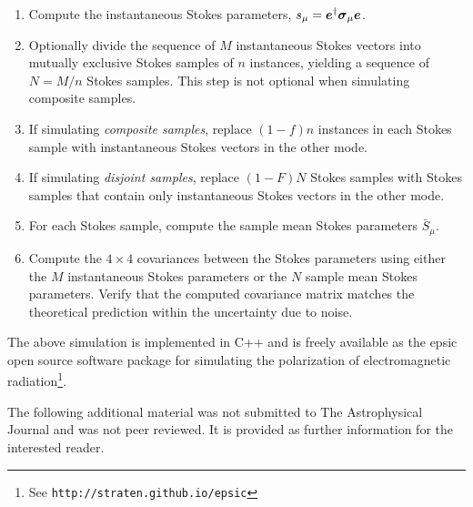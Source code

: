 \documentclass[twocolumn]{aastex6}
\newcommand{\mbf}[1]{\mbox{\boldmath $#1$}}
\newcommand{\irow}{\mu} \newcommand{\icol}{\nu}
\newcommand{\pauli}[1]{\ensuremath{\mbf{\sigma}_{#1}}}
\begin{document}
{\begin{appendix}
\begin{enumerate}
\item Compute the instantaneous Stokes parameters,
  $s_\irow=\mbf{e}^\dagger\pauli{\irow}\mbf{e}$.

\item Optionally divide the sequence of $M$ instantaneous Stokes
  vectors into mutually exclusive Stokes samples of $n$ instances,
  yielding a sequence of $N=M/n$ Stokes samples.  This step is not
  optional when simulating composite samples.

\item If simulating \emph{composite samples}, replace $(1-f)n$ instances
  in each Stokes sample with instantaneous Stokes vectors in the
  other mode.

\item If simulating \emph{disjoint samples}, replace $(1-F)N$ Stokes
  samples with Stokes samples that contain only instantaneous
  Stokes vectors in the other mode.

\item For each Stokes sample, compute the sample mean Stokes
  parameters $\bar{S}_\irow$.

\item Compute the $4\times4$ covariances between the Stokes parameters
  using either the $M$ instantaneous Stokes parameters or the $N$
  sample mean Stokes parameters.  Verify that the computed covariance
  matrix matches the theoretical prediction within the uncertainty due
  to noise.
  
\end{enumerate}
%

The above simulation is implemented in C++ and is freely available as
the {\sc epsic} open source software package for simulating the polarization
of electromagnetic radiation\footnote{See {\tt http://straten.github.io/epsic}}.

\end{appendix}




\begin{appendix}

  The following additional material was not submitted to The
  Astrophysical Journal and was not peer reviewed.  It is provided as
  further information for the interested reader. \\ [5mm]
  
\setcounter{section}{6}
\setcounter{equation}{61}
\def\theequation{\arabic{equation}}


\end{appendix}}
\end{document}
